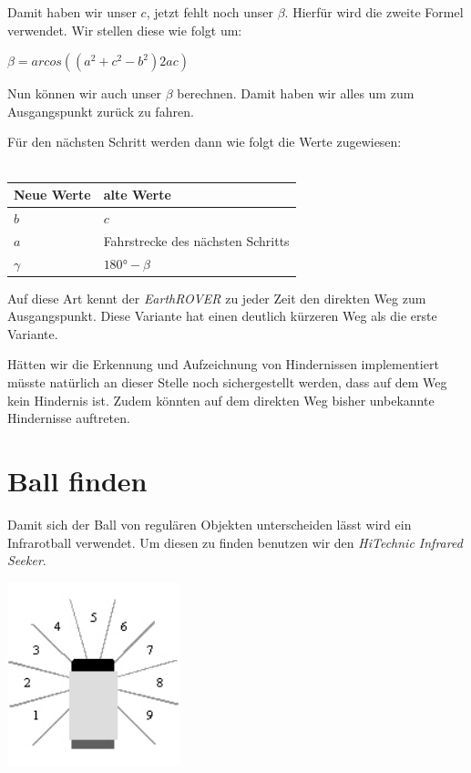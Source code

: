 Damit haben wir unser $c$, jetzt fehlt noch unser $\beta$. Hierfür wird die zweite Formel verwendet. Wir stellen diese wie folgt um:

$\beta = arcos((a^2 + c^2 - b^2)2ac)$

Nun können wir auch unser $\beta$ berechnen. Damit haben wir alles um zum Ausgangspunkt zurück zu fahren.

Für den nächsten Schritt werden dann wie folgt die Werte zugewiesen:\\
\\
\begin{tabular}[htbp]{|l|l|}
	\hline
	Neue Werte & alte Werte \\
	\hline
	$b$ & $c$ \\
	\hline
	$a$ & Fahrstrecke des nächsten Schritts \\
	\hline
	$\gamma$ & $180° - \beta$\\
	\hline
\end{tabular}

Auf diese Art kennt der \textit{EarthROVER} zu jeder Zeit den direkten Weg zum Ausgangspunkt. Diese Variante hat einen deutlich kürzeren Weg als die erste Variante.

Hätten wir die Erkennung und Aufzeichnung von Hindernissen implementiert müsste natürlich an dieser Stelle noch sichergestellt werden, dass auf dem Weg kein Hindernis ist. Zudem könnten auf dem direkten Weg bisher unbekannte Hindernisse auftreten.

\section{Ball finden}
Damit sich der Ball von regulären Objekten unterscheiden lässt wird ein Infrarotball verwendet. Um diesen zu finden benutzen wir den \textit{HiTechnic Infrared Seeker}.

\begin{capfigure}
	\includegraphics[width=5cm]{images/implementation/irseeker}
\end{capfigure}

